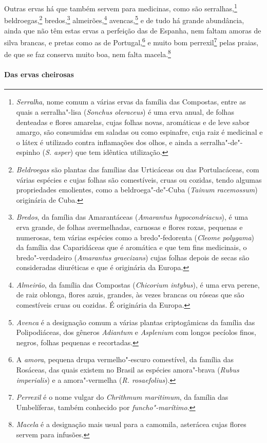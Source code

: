  Outras ervas há que também servem para medicinas, como são
serralhas,\footnote{ \textit{Serralha}, nome comum a várias ervas da
família das Compostas, entre as quais a serralha"-lisa (\textit{Sonchus
oleraceus}) é uma erva anual, de folhas denteadas e flores amarelas,
cujas folhas novas, aromáticas e de leve sabor amargo, são consumidas
em saladas ou como espinafre, cuja raiz é medicinal e o látex é
utilizado contra inflamações dos olhos, e ainda a serralha"-de"-espinho
(\textit{S. asper}) que tem idêntica utilização.} 
beldroegas,\footnote{ \textit{Beldroegas} são plantas das famílias das
Urticáceas ou das Portulacáceas, com várias espécies e cujas folhas são
comestíveis, cruas ou cozidas, tendo algumas propriedades emolientes,
como a beldroega"-de"-Cuba (\textit{Tainum racemossum}) originária de
Cuba.} bredos,\footnote{ \textit{Bredos}, da família das
Amarantáceas (\textit{Amarantus hypocondriacus}), é uma erva grande, de
folhas avermelhadas, carnosas e flores roxas, pequenas e numerosas, tem
várias espécies como a bredo"-fedorenta (\textit{Cleome polygama}) da
família das Caparidáceas que é aromática e que tem fins medicinais, o
bredo"-verdadeiro (\textit{Amarantus graecizans}) cujas folhas depois de
secas são consideradas diuréticas e que é originária da Europa.} 
almeirões,\footnote{ \textit{Almeirão}, da família das Compostas
(\textit{Chicorium intybus}), é uma erva perene, de raiz oblonga, flores
azuis, grandes, às vezes brancas ou róseas que são comestíveis cruas ou
cozidas. É originária da Europa.} avencas,\footnote{ \textit{Avenca} 
é a designação comum a várias plantas criptogâmicas
da família das Polipodiáceas, dos gêneros \textit{Adiantum} e 
\textit{Asplenium} com longos pecíolos finos, negros, folhas pequenas e
recortadas.} e de tudo há grande abundância, ainda que não têm estas
ervas a perfeição das de Espanha, nem faltam amoras de silva brancas, e
pretas como as de Portugal,\footnote{ A \textit{amora}, pequena drupa
vermelho"-escuro comestível, da família das Rosáceas, das quais existem
no Brasil as espécies amora"-brava (\textit{Rubus imperialis}) e a
amora"-vermelha (\textit{R. rosaefolius}).} e muito bom 
perrexil\footnote{ \textit{Perrexil} é o nome vulgar do \textit{Chrithmum
maritimum}, da família das Umbelíferas, também conhecido por
\textit{funcho"-marítimo.}} pelas praias, de que se faz conserva muito
boa, nem falta macela.\footnote{ \textit{Macela} é a designação mais
usual para a camomila, asterácea cujas flores servem para infusões.} 

\paragraph{Das ervas cheirosas}

